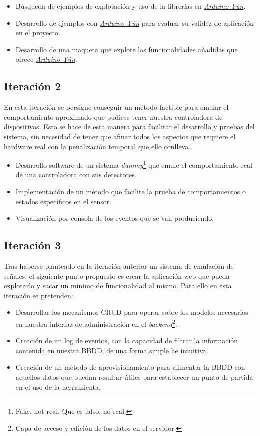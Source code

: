 \begin{itemize}
\item Búsqueda de ejemplos de explotación y uso de la librerías en \hyperref[tab:arduino-yun]{\textit{Arduino-Yún}}.
\item Desarrollo de ejemplos con \hyperref[tab:arduino-yun]{\textit{Arduino-Yún}} para evaluar su validez de aplicación en el proyecto.
\item Desarrollo de una maqueta que explote las funcionalidades añadidas que ofrece \hyperref[tab:arduino-yun]{\textit{Arduino-Yún}}.
\end{itemize}

\subsection{Iteración 2}
\label{sub:metodologiaiter2}

En esta iteración se persigue conseguir un método factible para emular el comportamiento aproximado que pudiese tener nuestra controladora de dispositivos. Esto se hace de esta manera para facilitar el desarrollo y pruebas del sistema, sin necesidad de tener que afinar todos los aspectos que requiere el hardware real con la penalización temporal que ello conlleva.
 
\begin{itemize}
\item Desarrollo software de un sistema \textit{dummy}\footnote{Fake, not real. Que es falso, no real.} que emule el comportamiento real de una controladora con sus detectores.
\item Implementación de un método que facilite la prueba de comportamientos o estados específicos en el sensor.
\item Visualización por consola de los eventos que se van produciendo. 
\end{itemize}

\subsection{Iteración 3}
\label{sub:metodologiaiter3}

Tras haberse planteado en la iteración anterior un sistema de emulación de señales, el siguiente punto propuesto es crear la aplicación web que pueda explotarlo y sacar un mínimo de funcionalidad al mismo. Para ello en esta iteración se pretenden:

\begin{itemize}
 \item Desarrollar los mecanismos CRUD para operar sobre los modelos necesarios en nuestra interfaz de administración en el \textit{backend}\footnote{Capa de acceso y edición de los datos en el servidor.}.
 \item Creación de un log de eventos, con la capacidad de filtrar la información contenida en nuestra \acs{BBDD}, de una forma simple he intuitiva.
 \item Creación de un método de aprovisionamiento para alimentar la \acs{BBDD} con aquellos datos que puedan resultar útiles para establecer un punto de partida en el uso de la herramienta.
 \end{itemize}

